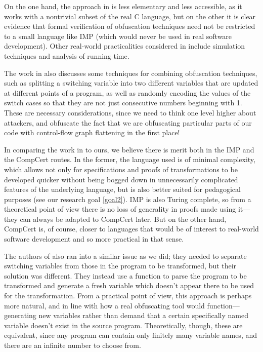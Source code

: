 \documentclass[compsoc,conference,a4paper,10pt,times]{IEEEtran}
\begin{document}
On the one hand, the approach in \cite{Blazy2} is less elementary and less accessible, as it works with a nontrivial subset of the real C language, but on the other it is clear evidence that formal verification of obfuscation techniques need not be restricted to a small language like IMP (which would never be used in real software development). Other real-world practicalities considered in \cite{Blazy2} include simulation techniques and analysis of running time.

The work in \cite{Blazy2} also discusses some techniques for combining obfuscation techniques, such as splitting a switching variable into two different variables that are updated at different points of a program, as well as randomly encoding the values of the switch cases so that they are not just consecutive numbers beginning with 1.  These are necessary considerations, since we need to think one level higher about attackers, and obfuscate the fact that we are obfuscating particular parts of our code with control-flow graph flattening in the first place!

In comparing the work in \cite{Blazy2} to ours, we believe there is merit both in the IMP and the CompCert routes.  In the former, the language used is of minimal complexity, which allows not only for specifications and proofs of transformations to be developed quicker without being bogged down in unnecessarily complicated features of the underlying language, but is also better suited for pedagogical purposes (see our research goal \ref{goal2}). IMP is also Turing complete, so from a theoretical point of view there is no loss of generality in proofs made using it---they can always be adapted to CompCert later.  But on the other hand, CompCert is, of course, closer to languages that would be of interest to real-world software development and so more practical in that sense.

The authors of \cite{Blazy2} also ran into a similar issue as we did; they needed to separate switching variables from those in the program to be transformed, but their solution was different. They instead use a function to parse the program to be transformed and generate a fresh variable which doesn't appear there to be used for the transformation.  From a practical point of view, this approach is perhaps more natural, and in line with how a real obfuscating tool would function---generating new variables rather than demand that a certain specifically named variable doesn't exist in the source program.  Theoretically, though, these are equivalent, since any program can contain only finitely many variable names, and there are an infinite number to choose from.
\end{document}
